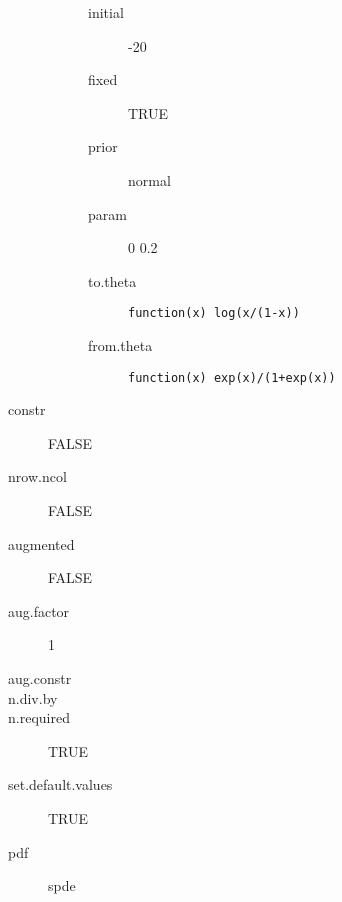 \begin{description}
\begin{description}
\begin{description}
	 	 	\item[initial] -20
	 	 	\item[fixed] TRUE
	 	 	\item[prior] normal
	 	 	\item[param] 0 0.2
	 	 	\item[to.theta] \verb|function(x) log(x/(1-x))|
	 	 	\item[from.theta] \verb|function(x) exp(x)/(1+exp(x))|
	 	 \end{description}
	 \end{description}
	\item[constr] FALSE
	\item[nrow.ncol] FALSE
	\item[augmented] FALSE
	\item[aug.factor] 1
	\item[aug.constr] 
	\item[n.div.by] 
	\item[n.required] TRUE
	\item[set.default.values] TRUE
	\item[pdf] spde
\end{description}
